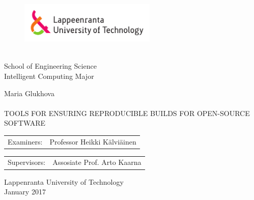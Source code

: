 
\thispagestyle{empty} 
\setlength{\parindent}{0pt}
\begin{figure}
\includegraphics[width=65mm]{./figs/Merkki_Logo_CMYK}\\
\end{figure}
~\\
School of Engineering Science\\
Intelligent Computing Major\\


\vspace{60mm}

{\sffamily\large Maria Glukhova\\
\\
\MakeUppercase{\Large Tools for Ensuring Reproducible Builds for Open-Source Software}}\\



\begin{tabular}{l p{11.0cm}}  
  
Examiners: & Professor \foreignlanguage{finnish}{Heikki Kälviäinen}\\

\end {tabular}

\begin{tabular}{l p{11.0cm}}  
  
Supervisors: & Assosiate Prof. Arto Kaarna\\

\end {tabular}





\begin{center}
Lappenranta University of Technology\\
January 2017

 \end{center}
\pagebreak

